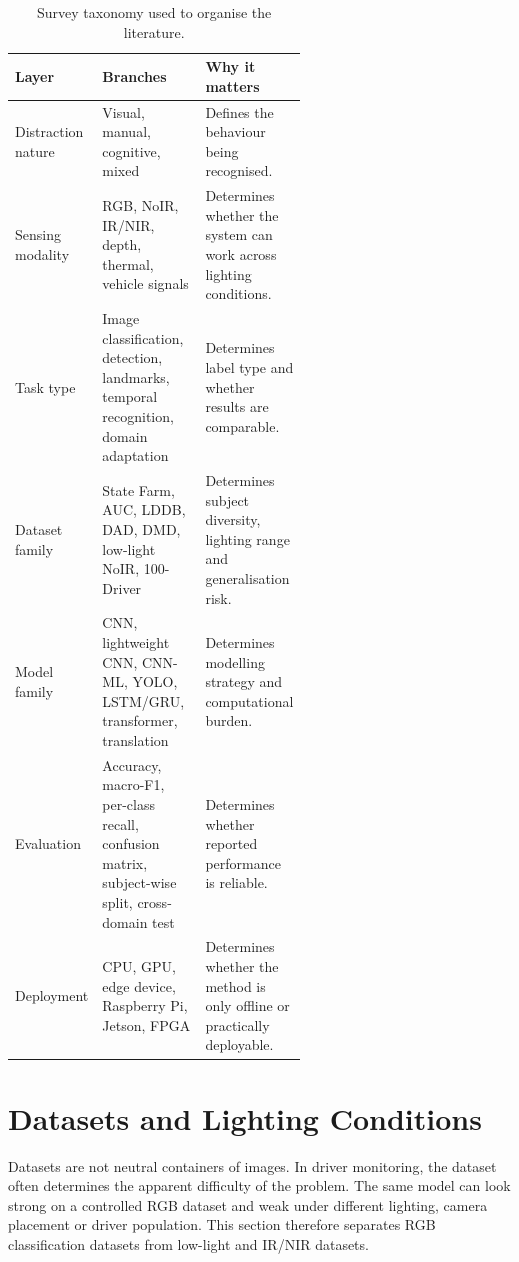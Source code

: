 \documentclass[11pt,a4paper]{article}
\let\oldsection\section
\renewcommand{\section}{\FloatBarrier\Needspace{9\baselineskip}\oldsection}
\begin{document}
\begin{table}[H]
\centering
\caption{Survey taxonomy used to organise the literature.}
\label{tab:survey_taxonomy}
\small
\renewcommand{\arraystretch}{1.12}
\begin{tabularx}{\linewidth}{>{\RaggedRight\arraybackslash}p{0.22\linewidth} >{\RaggedRight\arraybackslash}p{0.36\linewidth} >{\RaggedRight\arraybackslash}X}
\toprule
\textbf{Layer} & \textbf{Branches} & \textbf{Why it matters} \\
\midrule
Distraction nature & Visual, manual, cognitive, mixed & Defines the behaviour being recognised. \\
Sensing modality & RGB, NoIR, IR/NIR, depth, thermal, vehicle signals & Determines whether the system can work across lighting conditions. \\
Task type & Image classification, detection, landmarks, temporal recognition, domain adaptation & Determines label type and whether results are comparable. \\
Dataset family & State Farm, AUC, LDDB, DAD, DMD, low-light NoIR, 100-Driver & Determines subject diversity, lighting range and generalisation risk. \\
Model family & CNN, lightweight CNN, CNN-ML, YOLO, LSTM/GRU, transformer, translation & Determines modelling strategy and computational burden. \\
Evaluation & Accuracy, macro-F1, per-class recall, confusion matrix, subject-wise split, cross-domain test & Determines whether reported performance is reliable. \\
Deployment & CPU, GPU, edge device, Raspberry Pi, Jetson, FPGA & Determines whether the method is only offline or practically deployable. \\
\bottomrule
\end{tabularx}
\normalsize
\end{table}

\section{Datasets and Lighting Conditions}

Datasets are not neutral containers of images. In driver monitoring, the dataset often determines the apparent difficulty of the problem. The same model can look strong on a controlled RGB dataset and weak under different lighting, camera placement or driver population. This section therefore separates RGB classification datasets from low-light and IR/NIR datasets.
\end{document}
